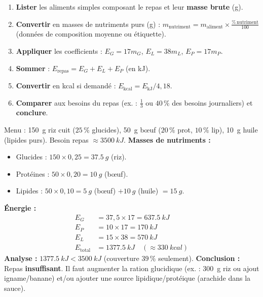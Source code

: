 \documentclass[11pt]{article}
\begin{document}
\begin{methode}
\begin{enumerate}
\item \textbf{Lister} les aliments simples composant le repas et leur \textbf{masse brute} (g).
\item \textbf{Convertir} en masses de nutriments purs (g) : $m_{\text{nutriment}} = m_{\text{aliment}} \times \frac{\%\,\text{nutriment}}{100}$ (données de composition moyenne ou étiquette).
\item \textbf{Appliquer} les coefficients : $E_G = 17 m_G$, $E_L = 38 m_L$, $E_P = 17 m_P$.
\item \textbf{Sommer} : $E_{\text{repas}} = E_G + E_L + E_P$ (en kJ).
\item \textbf{Convertir} en kcal si demandé : $E_{\text{kcal}} = E_{\text{kJ}} / 4,18$.
\item \textbf{Comparer} aux besoins du repas (ex. : $\frac{1}{3}$ ou $40\,\%$ des besoins journaliers) et \textbf{conclure}.
\end{enumerate}
\end{methode}

\begin{exoresolu}
Menu : \SI{150}{g} riz cuit ($25\,\%$ glucides), \SI{50}{g} bœuf ($20\,\%$ prot, $10\,\%$ lip), \SI{10}{g} huile (lipides purs). Besoin repas $\approx \SI{3500}{kJ}$.
\tcblower
\textbf{Masses de nutriments :}
\begin{itemize}
\item Glucides : $150 \times 0,25 = \SI{37,5}{g}$ (riz).
\item Protéines : $50 \times 0,20 = \SI{10}{g}$ (bœuf).
\item Lipides : $50 \times 0,10 = \SI{5}{g}$ (bœuf) $+ \SI{10}{g}$ (huile) $= \SI{15}{g}$.
\end{itemize}
\textbf{Énergie :}
\begin{align*}
E_G &= 37,5 \times 17 = \SI{637,5}{kJ} \\
E_P &= 10 \times 17 = \SI{170}{kJ} \\
E_L &= 15 \times 38 = \SI{570}{kJ} \\
E_{\text{total}} &= \SI{1377,5}{kJ} \quad (\approx \SI{330}{kcal})
\end{align*}
\textbf{Analyse :} $\SI{1377,5}{kJ} < \SI{3500}{kJ}$ (couverture $39\,\%$ seulement).
\textbf{Conclusion :} Repas \textbf{insuffisant}. Il faut augmenter la ration glucidique (ex. : \SI{300}{g} riz ou ajout igname/banane) et/ou ajouter une source lipidique/protéique (arachide dans la sauce).
\end{exoresolu}
\end{document}
